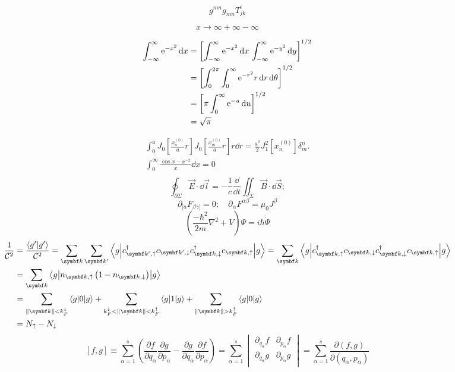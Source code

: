 \documentclass[english,log-declarations=false]{article}
\begin{document}
\[ g^{mn} g_{mn} T^{i}_{jk} \]

\[ x \to \infty + \infty - \infty \]

\begin{align*}
     \int_{-\infty}^\infty \mathrm{e}^{-x^2} \dd{x}
  &= \qty[\int_{-\infty}^\infty \mathrm{e}^{-x^2} \dd{x} \, \int_{-\infty}^\infty \mathrm{e}^{-y^2} \dd{y}]^{1/2} \\
  &= \qty[\int_0^{2\pi} \int_0^\infty \mathrm{e}^{-r^2} r \dd{r}\dd{\theta}]^{1/2} \\
  &= \qty[\pi \int_0^\infty \mathrm{e}^{-u} \dd{u}]^{1/2} \\
  &= \sqrt{\pi}
\end{align*}


\begin{align*}
\int_{0}^aJ_0\left[\frac{x_n^{(0)}}{a}r\right]J_0\left[\frac{x_m^{(0)}}{a}r\right]r\dd{r}=\frac{a^2}{2}J_1^2[x_n^{(0)}]\delta_m^n.\\
\int_{0}^{\infty}\frac{\cos x-\ee^{-x}}{x}\dd{x}=0\\
\end{align*}
\[\oint_{\partial\Sigma}\vec E\cdot \dd{\vec{l}}=-\frac{1}{c}\frac{\dd}{\dd t}\iint_{\Sigma}\vec B \cdot \dd{\vec{S}};\]
\[\partial_{[a}F_{\beta\gamma]}=0;\quad \partial_\alpha F^{\alpha\beta}=\mu_0J^\beta\]
\[\left(\frac{-\hbar^2}{2m}\nabla^2+V\right)\Psi=i\hbar\dot{\Psi}\]
\[\begin{split}
\frac{1}{\mathcal{C}^2}&{}=\frac{\innerprod{g'}{g'}}{\mathcal{C}^2}=\sum_{\bm{k}}\sum_{\bm{k}'}\brakket{g}{c_{\bm{k}',\uparrow}^\dagger c_{\bm{k}',\downarrow} c_{\bm{k},\downarrow}^\dagger c_{\bm{k},\uparrow}}{g}=\sum_{\bm{k}}\brakket{g}{c_{\bm{k},\uparrow}^\dagger c_{\bm{k},\downarrow} c_{\bm{k},\downarrow}^\dagger c_{\bm{k},\uparrow}}{g}\\
&{}=\sum_{\bm{k}}\brakket{g}{n_{\bm{k},\uparrow}\left(1-n_{\bm{k},\downarrow}\right)}{g}\\
&{}=\sum_{\norm{\bm{k}}<k_F^\downarrow}\brakket{g}{0}{g}+\sum_{k_F^\downarrow<\norm{\bm{k}}<k_F^\uparrow}\brakket{g}{1}{g}+\sum_{\norm{\bm{k}}>k_F^\uparrow}\brakket{g}{0}{g}\\
&{}=N_\uparrow-N_\downarrow
\end{split}\]
\[\left[ f,g \right]\equiv \sum_{\alpha =1}^{s}{\left( \frac{\partial f}{\partial {{q}_{\alpha }}}\frac{\partial g}{\partial {{p}_{\alpha }}}-\frac{\partial g}{\partial {{q}_{\alpha }}}\frac{\partial f}{\partial {{p}_{\alpha }}} \right)}=\sum\limits_{\alpha =1}^{s}{\begin{vmatrix}
	\partial_{{q}_{\alpha }} f & \partial_{{p}_{\alpha }} f  \\
	\partial_{{q}_{\alpha }} g & \partial_{{p}_{\alpha }} g  \\
	\end{vmatrix} }=\sum\limits_{\alpha =1}^{s}{\frac{\partial \left( f,g \right)}{\partial \left( {{q}_{\alpha }},{{p}_{\alpha }} \right)}}\]
\end{document}
